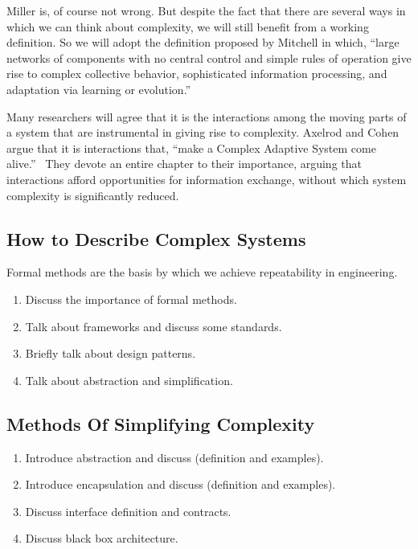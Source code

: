 \documentclass[jou,apacite]{apa6}
\begin{document}
Miller is, of course not wrong.  But despite the fact that there are several ways in which we can think about complexity, we will still benefit from a working definition.  So we will adopt the definition proposed by Mitchell in which, ``large networks of components with no central control and simple rules of operation give rise to complex collective behavior, sophisticated information processing, and adaptation via learning or evolution.''~\cite[page 13]{Mitchell}

Many researchers will agree that it is the interactions among the moving parts of a system that are instrumental in giving rise to complexity.  Axelrod and Cohen argue that it is interactions that, ``make a Complex Adaptive System come alive.''~\cite[page 63]{Axelrod} They devote an entire chapter to their importance, arguing that interactions afford opportunities for information exchange, without which system complexity is significantly reduced.  


\subsection{How to Describe Complex Systems}  %
Formal methods are the basis by which we achieve repeatability in engineering.

\begin{enumerate}
  \item Discuss the importance of formal methods.
  \item Talk about frameworks and discuss some standards.
  \item Briefly talk about design patterns.
  \item Talk about abstraction and simplification.
\end{enumerate}

\subsection{Methods Of Simplifying Complexity}  %
\begin{enumerate}
  \item Introduce abstraction and discuss (definition and examples).
  \item Introduce encapsulation and discuss (definition and examples).
  \item Discuss interface definition and contracts.
  \item Discuss black box architecture.
\end{enumerate}
\end{document}
